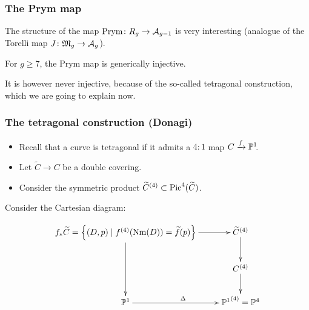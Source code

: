 

\begin{frame}
\frametitle{The Prym map}

The structure of the map $\Prym\colon R_g \to \A_{g-1}$ is very interesting (analogue of the Torelli map $J\colon\mathfrak M_g \to \A_g$).

\pause

\begin{theorem}

For $g \geq 7$, the Prym map is generically injective. 

\end{theorem}
\pause

It is however \alert{never} injective, because of the so-called \alert{tetragonal construction}, which we are going to explain now.
\end{frame}

\begin{frame}
\frametitle{The tetragonal construction (Donagi)}

\begin{itemize}
	\item Recall that a curve is \alert{tetragonal} if it admits a $4:1$ map $C \xrightarrow{f} \P^1\mkern-4mu$.
	\pause
	\item Let $\widetilde C \to C$ be a double covering.
	\pause
	\item Consider the symmetric product ${\widetilde C}^{(4)} \subset \Pic^4(\widetilde C)$.
\end{itemize}
\pause

Consider the Cartesian diagram:

\[
\xymatrix{
f_\ast \widetilde C = \left\{ (D,p) \mid f^{(4)}(\Nm(D)) = \widetilde f (p) \right\} \ar[r] \ar[dd] & {\widetilde C}^{(4)} \ar[d] \\
 & C^{(4)} \ar[d] \\
\P^1 \ar[r]^\Delta & {\P^1}^{(4)} = \P^4
}
\]
\end{frame}


